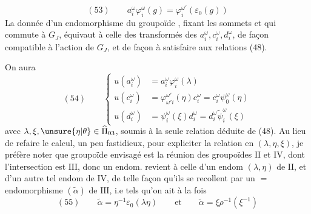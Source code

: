 \[
(53)\qquad a_i^\omega\varphi_i^\omega(g)=\varphi_i^{\omega'}(\varepsilon_0(g))
\]
La donnée d'un endomorphisme du groupoïde , fixant les sommets et qui commute à $G_J$, équivaut à celle des  transformés des $a_i^\omega,c_i^\omega,d_i^\omega$, de façon  compatible à l'action de $G_J$, et de façon à satisfaire aux relations (48).

On aura
\[
(54)\qquad\left\{\begin{aligned}
u(a_i^\omega)&=a_i^\omega\varphi_i^\omega(\lambda)\\
u(c_i^\omega)&=\varphi_{\omega'i}^{\omega'}(\eta)c_i^\omega=c_i^\omega\psi_0^\omega(\eta)\\
u(d_i^\omega)&=\psi_i^\omega(\xi)d_i^\omega=d_i^\omega\widetilde\psi_i^\omega(\xi)
\end{aligned}\right.
\]
avec $\lambda,\xi,\unsure{\eta|\theta}\in\widehat\Pi_{03}$, soumis à la seule relation déduite de (48). Au lieu de refaire le calcul, un peu fastidieux, pour expliciter la relation en $(\lambda,\eta,\xi)$, je préfère noter que  groupoïde envisagé est la réunion des groupoïdes $\mathrm{II}$ et $\mathrm{IV}$, dont l'intersection est $\mathrm{III}$, donc un endom.  revient à celle d'un  endom $(\lambda,\eta)$ de $\mathrm{II}$, et d'un autre tel endom \inserted{$\xi$} de $\mathrm{IV}$, de telle façon qu'ils se recollent  par un $=$ endomorphisme $(\widetilde\alpha)$ de $\mathrm{III}$, i.e tels qu'on ait à la fois
\[
(55)\qquad\widetilde\alpha=\eta^{-1}\varepsilon_0(\lambda\eta)\qquad\text{et}\qquad
\widetilde\alpha=\xi\rho^{-1}(\xi^{-1})
\]
